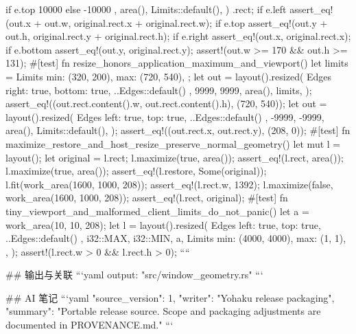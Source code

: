 {{{                    if e.top { 10000 } else { -10000 },
                    area(),
                    Limits::default(),
                )
                .rect;
            if e.left {
                assert_eq!(out.x + out.w, original.rect.x + original.rect.w);
            }
            if e.top {
                assert_eq!(out.y + out.h, original.rect.y + original.rect.h);
            }
            if e.right {
                assert_eq!(out.x, original.rect.x);
            }
            if e.bottom {
                assert_eq!(out.y, original.rect.y);
            }
            assert!(out.w >= 170 && out.h >= 131);
        }
    }
    #[test]
    fn resize_honors_application_maximum_and_viewport() {
        let limits = Limits {
            min: (320, 200),
            max: (720, 540),
        };
        let out = layout().resized(
            Edges {
                right: true,
                bottom: true,
                ..Edges::default()
            },
            9999,
            9999,
            area(),
            limits,
        );
        assert_eq!((out.rect.content().w, out.rect.content().h), (720, 540));
        let out = layout().resized(
            Edges {
                left: true,
                top: true,
                ..Edges::default()
            },
            -9999,
            -9999,
            area(),
            Limits::default(),
        );
        assert_eq!((out.rect.x, out.rect.y), (208, 0));
    }
    #[test]
    fn maximize_restore_and_host_resize_preserve_normal_geometry() {
        let mut l = layout();
        let original = l.rect;
        l.maximize(true, area());
        assert_eq!(l.rect, area());
        l.maximize(true, area());
        assert_eq!(l.restore, Some(original));
        l.fit(work_area(1600, 1000, 208));
        assert_eq!(l.rect.w, 1392);
        l.maximize(false, work_area(1600, 1000, 208));
        assert_eq!(l.rect, original);
    }
    #[test]
    fn tiny_viewport_and_malformed_client_limits_do_not_panic() {
        let a = work_area(10, 10, 208);
        let l = layout().resized(
            Edges {
                left: true,
                top: true,
                ..Edges::default()
            },
            i32::MAX,
            i32::MIN,
            a,
            Limits {
                min: (4000, 4000),
                max: (1, 1),
            },
        );
        assert!(l.rect.w > 0 && l.rect.h > 0);
    }
}
````

## 输出与关联
```yaml
output: "src/window_geometry.rs"
```

## AI 笔记
```yaml
{"source_version": 1, "writer": "Yohaku release packaging", "summary": "Portable release source. Scope and packaging adjustments are documented in PROVENANCE.md."}
```
